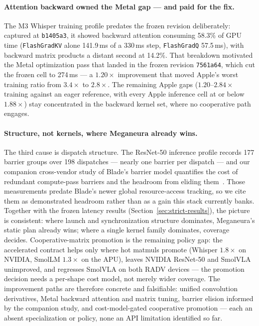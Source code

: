 \documentclass[10pt,twocolumn]{article}
\newcommand{\system}{Meganeura}
\newcommand{\code}[1]{\texttt{#1}}
\begin{document}
\paragraph{Attention backward owned the Metal gap --- and paid for the fix.}
The M3 Whisper training profile predates the frozen revision deliberately:
captured at \code{b1405a3}, it showed backward attention consuming 58.3\%
of GPU time (\code{FlashGradKV} alone 141.9\,ms of a 330\,ms step,
\code{FlashGradQ} 57.5\,ms), with backward matrix products a distant second
at 14.2\%. That breakdown motivated the Metal optimization pass that landed
in the frozen revision \code{7561a64}, which cut the frozen cell to
274\,ms --- a $1.20\times$ improvement that moved Apple's worst training
ratio from $3.4\times$ to $2.8\times$. The remaining Apple gaps
($1.20$--$2.84\times$ training against an eager reference, with every
Apple inference cell at or below $1.88\times$) stay concentrated in the
backward kernel set, where no cooperative path engages.

\paragraph{Structure, not kernels, where \system{} already wins.}
The third cause is dispatch structure. The ResNet-50 inference profile
records 177 barrier groups over 198 dispatches --- nearly one barrier per
dispatch --- and our companion cross-vendor study of Blade's barrier model
quantifies the cost of redundant compute-pass barriers and the headroom
from eliding them~\cite{malyshau2026barriers}. Those measurements predate
Blade's newer global resource-access tracking, so we cite them as
demonstrated headroom rather than as a gain this stack currently banks.
Together with the frozen latency results
(Section~\ref{sec:strict-results}), the picture is consistent: where launch
and synchronization structure dominates, \system{}'s static plan already
wins; where a single kernel family dominates, coverage decides.
Cooperative-matrix promotion is the remaining
policy gap: the accelerated contract helps only where hot matmuls promote
(Whisper $1.8\times$ on NVIDIA, SmolLM $1.3\times$ on the APU), leaves
NVIDIA ResNet-50 and SmolVLA unimproved, and regresses SmolVLA on both
RADV devices --- the promotion decision needs a per-shape cost model, not
merely wider coverage. The improvement paths are therefore concrete and
falsifiable: unified convolution derivatives, Metal backward attention and
matrix tuning, barrier elision informed by the companion study, and
cost-model-gated cooperative promotion --- each an absent specialization or
policy, none an API limitation identified so far.
\end{document}
